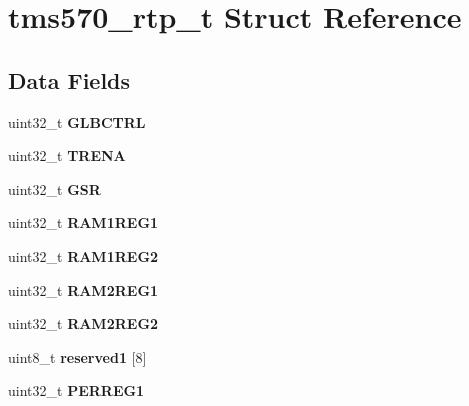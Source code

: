 \hypertarget{structtms570__rtp__t}{}\section{tms570\+\_\+rtp\+\_\+t Struct Reference}
\label{structtms570__rtp__t}
\subsection*{Data Fields}
\begin{DoxyCompactItemize}
\item 
\mbox{\label{structtms570__rtp__t_a6c5a6e2b197df9414f756aa6639a3b84}} 
uint32\+\_\+t {\bfseries G\+L\+B\+C\+T\+RL}
\item 
\mbox{\label{structtms570__rtp__t_a3a63dc33b8067a6c21714e1b3f9f7bf3}} 
uint32\+\_\+t {\bfseries T\+R\+E\+NA}
\item 
\mbox{\label{structtms570__rtp__t_a5b8c97d5c832ceb2de0d98f722df3867}} 
uint32\+\_\+t {\bfseries G\+SR}
\item 
\mbox{\label{structtms570__rtp__t_ab518b43d819608bef478b2da09e47d0a}} 
uint32\+\_\+t {\bfseries R\+A\+M1\+R\+E\+G1}
\item 
\mbox{\label{structtms570__rtp__t_afa7dffdb9e2899d74d781f667d15f942}} 
uint32\+\_\+t {\bfseries R\+A\+M1\+R\+E\+G2}
\item 
\mbox{\label{structtms570__rtp__t_ae621878136b6f381fef561431951fcc3}} 
uint32\+\_\+t {\bfseries R\+A\+M2\+R\+E\+G1}
\item 
\mbox{\label{structtms570__rtp__t_a6503a99c98794354dd0e11c498266c3b}} 
uint32\+\_\+t {\bfseries R\+A\+M2\+R\+E\+G2}
\item 
\mbox{\label{structtms570__rtp__t_a37607c4b90ff9718f8e24ed82f495f6d}} 
uint8\+\_\+t {\bfseries reserved1} \mbox{[}8\mbox{]}
\item 
\mbox{\label{structtms570__rtp__t_a496b235cfc260cbda0f28396055d2ccd}} 
uint32\+\_\+t {\bfseries P\+E\+R\+R\+E\+G1}

\end{DoxyCompactItemize}

